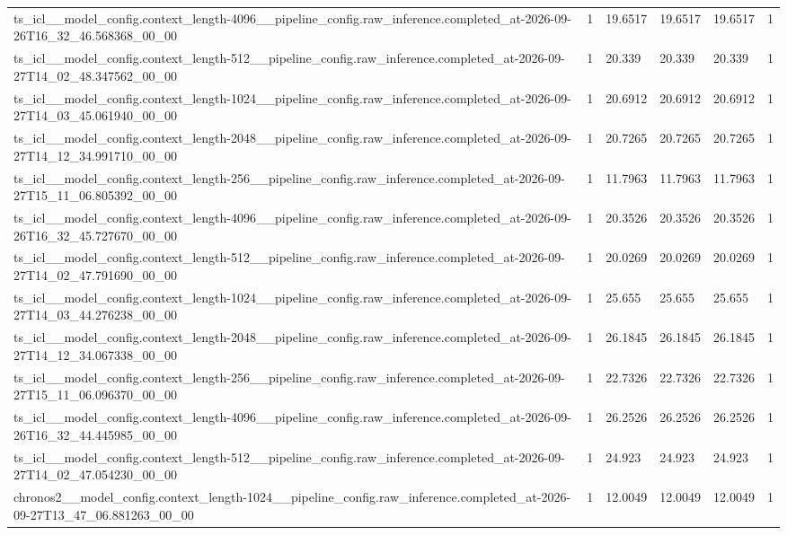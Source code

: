 \begin{tabular}{llllll}
ts\_icl\_\_model\_config.context\_length-4096\_\_pipeline\_config.raw\_inference.completed\_at-2026-09-26T16\_32\_46.568368\_00\_00 & 1 & 19.6517 & 19.6517 & 19.6517 & 1 \\
ts\_icl\_\_model\_config.context\_length-512\_\_pipeline\_config.raw\_inference.completed\_at-2026-09-27T14\_02\_48.347562\_00\_00 & 1 & 20.339 & 20.339 & 20.339 & 1 \\
ts\_icl\_\_model\_config.context\_length-1024\_\_pipeline\_config.raw\_inference.completed\_at-2026-09-27T14\_03\_45.061940\_00\_00 & 1 & 20.6912 & 20.6912 & 20.6912 & 1 \\
ts\_icl\_\_model\_config.context\_length-2048\_\_pipeline\_config.raw\_inference.completed\_at-2026-09-27T14\_12\_34.991710\_00\_00 & 1 & 20.7265 & 20.7265 & 20.7265 & 1 \\
ts\_icl\_\_model\_config.context\_length-256\_\_pipeline\_config.raw\_inference.completed\_at-2026-09-27T15\_11\_06.805392\_00\_00 & 1 & 11.7963 & 11.7963 & 11.7963 & 1 \\
ts\_icl\_\_model\_config.context\_length-4096\_\_pipeline\_config.raw\_inference.completed\_at-2026-09-26T16\_32\_45.727670\_00\_00 & 1 & 20.3526 & 20.3526 & 20.3526 & 1 \\
ts\_icl\_\_model\_config.context\_length-512\_\_pipeline\_config.raw\_inference.completed\_at-2026-09-27T14\_02\_47.791690\_00\_00 & 1 & 20.0269 & 20.0269 & 20.0269 & 1 \\
ts\_icl\_\_model\_config.context\_length-1024\_\_pipeline\_config.raw\_inference.completed\_at-2026-09-27T14\_03\_44.276238\_00\_00 & 1 & 25.655 & 25.655 & 25.655 & 1 \\
ts\_icl\_\_model\_config.context\_length-2048\_\_pipeline\_config.raw\_inference.completed\_at-2026-09-27T14\_12\_34.067338\_00\_00 & 1 & 26.1845 & 26.1845 & 26.1845 & 1 \\
ts\_icl\_\_model\_config.context\_length-256\_\_pipeline\_config.raw\_inference.completed\_at-2026-09-27T15\_11\_06.096370\_00\_00 & 1 & 22.7326 & 22.7326 & 22.7326 & 1 \\
ts\_icl\_\_model\_config.context\_length-4096\_\_pipeline\_config.raw\_inference.completed\_at-2026-09-26T16\_32\_44.445985\_00\_00 & 1 & 26.2526 & 26.2526 & 26.2526 & 1 \\
ts\_icl\_\_model\_config.context\_length-512\_\_pipeline\_config.raw\_inference.completed\_at-2026-09-27T14\_02\_47.054230\_00\_00 & 1 & 24.923 & 24.923 & 24.923 & 1 \\
chronos2\_\_model\_config.context\_length-1024\_\_pipeline\_config.raw\_inference.completed\_at-2026-09-27T13\_47\_06.881263\_00\_00 & 1 & 12.0049 & 12.0049 & 12.0049 & 1 \\

\end{tabular}

